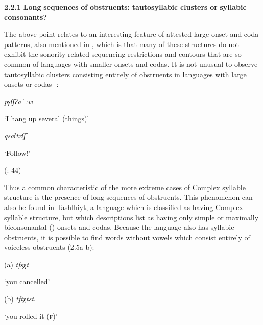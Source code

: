 \textbf{2.2.1} \textbf{Long} \textbf{sequences} \textbf{of} \textbf{obstruents:} \textbf{tautosyllabic} \textbf{clusters} \textbf{or} \textbf{syllabic} \textbf{consonants?}

  The above point relates to an interesting feature of attested large onset and coda patterns, also mentioned in , which is that many of these structures do not exhibit the sonority-related sequencing restrictions and contours that are so common of languages with smaller onsets and codas. It is not unusual to observe tautosyllabic clusters consisting entirely of obstruents in languages with large onsets or codas -:

\ea\label{ex:(2.3)}

  \textit{pʂt͡ʃʔa\'{} ːw}

  ‘I hang up several (things)’

  \citep[36]{Crawford1966}

\z

\ea\label{ex:(2.4)}

  \textit{qsaɬtxt͡ʃ}

  ‘Follow!’

  (\citealt{GeorgVolodin1999}: 44)

\z

  Thus a common characteristic of the more extreme cases of Complex syllable structure is the presence of long sequences of obstruents. This phenomenon can also be found in Tashlhiyt, a language which is classified as having Complex syllable structure, but which descriptions list as having only simple \citep{Ridouane2008} or maximally biconsonantal (\citealt{PuechLouali1999}) onsets and codas. Because the language also has syllabic obstruents, it is possible to find words without vowels which consist entirely of voiceless obstruents (2.5a-b):

\ea\label{ex:(2.5)}

(a)  \textit{tfsχt}

\glt ‘you cancelled’

(b)  \textit{tftχtstː}

\glt ‘you rolled it (\textsc{f})’

  \citep[95]{Ridouane2002}
\z

